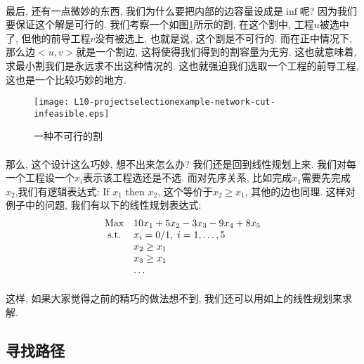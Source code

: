\documentclass[a4paper]{article}
\renewcommand{\figurename}{图}
\begin{document}
            \paragraph{}最后, 还有一点微妙的东西, 我们为什么要把内部的边容量设成是$\inf$呢? 因为我们要保证这个解是可行的. 我们考察一个如\figurename\ref{Figure: projecgt_selection_example_network_cut_infeasible}所示的割, 在这个割中, 工程$u$被选中了, 但他的前导工程$v$没有被选上, 也就是说, 这个割是不可行的. 而在正中情况下, 那么边$<u,v>$就是一个割边, 这将使得我们得到的割容量为无穷. 这也就意味着, 求最小割我们是永远求不出这种情况的. 这也就强迫我们选取一个工程的前导工程, 这也是一个比较巧妙的地方.
            \begin{figure}[h]
                \centering
                \texttt{[image: L10-projectselectionexample-network-cut-infeasible.eps]}
                \caption{一种不可行的割}
                \label{Figure: projecgt_selection_example_network_cut_infeasible}
            \end{figure}
            \paragraph{}那么, 这个设计这么巧妙, 想不出来怎么办? 我们还是回到线性规划上来. 我们对每一个工程设一个$x_i$表示该工程选还是不选. 而对先序关系, 比如完成$x_1$需要先完成$x_2$,我们有逻辑表达式: If $x_1$ then $x_2$, 这个等价于$x_2 \geq x_1$, 其他的边也同理. 这样对例子中的问题, 我们有以下的线性规划表达式:
            \begin{equation*}
\begin{array}{cl@{}ll}
\text{Max}  & 10x_1 + 5x_2 - 3x_3 - 9 x_4 + 8 x_5 &\\
\text{s.t.} & x_i = 0/1,\; i = 1,\dots,5  &\\
            & x_2 \geq x_1 &  \\
            & x_3 \geq x_1 &  \\
            & \dots
\end{array}
            \end{equation*}
            \paragraph{}这样, 如果大家觉得之前的精巧的做法想不到, 我们还可以用如上的线性规划来求解.

            
            
    \subsection{寻找路径}
\end{document}
